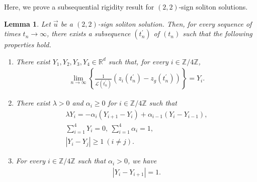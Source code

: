 \documentclass[10pt,a4paper]{amsart}
\newtheorem{lemma}[theorem]{Lemma}
\numberwithin{equation}{section}
\begin{document}
Here, we prove a subsequential rigidity result for $(2,2)$-sign soliton solutions.

\begin{lemma}\label{tenretujouken}
Let $\vec{u}$ be a $(2,2)$-sign soliton solution. Then, for every sequence of times $t_n\to\infty$, there exists a subsequence $(t_n^{\prime})$ of $(t_n)$ such that the following properties hold.
\begin{enumerate}
\item There exist $Y_1,Y_2,Y_3,Y_4\in\mathbb{R}^d$ such that, for every $i\in\mathbb{Z}/4\mathbb{Z}$,
\begin{align}\label{abouttenretu1}
\lim_{n\to\infty}\left\{\frac{1}{\mathcal{L}(t_n^{\prime})}\left(z_i(t_n^{\prime})-z_g(t_n^{\prime})\right)\right\}=Y_i.
\end{align}

\item There exist $\lambda>0$ and $\alpha_i\geq 0$ for $i\in\mathbb{Z}/4\mathbb{Z}$ such that
\begin{align}
\lambda Y_i=-\alpha_i\left(Y_{i+1}-Y_i\right)+\alpha_{i-1}\left(Y_i-Y_{i-1}\right),\label{odekarakuru0808}
\\
\sum_{i=1}^4Y_i=0,\ \sum_{i=1}^4\alpha_i=1,\label{wateisuu0808}
\\
\left|Y_i-Y_j\right|\geq 1\ (i\neq j).\label{nagasa1ijou0808}
\end{align}

\item For every $i\in\mathbb{Z}/4\mathbb{Z}$ such that $\alpha_i>0$, we have
\begin{align*}
|Y_i-Y_{i+1}|=1.
\end{align*}
\end{enumerate}
\end{lemma}
\end{document}
